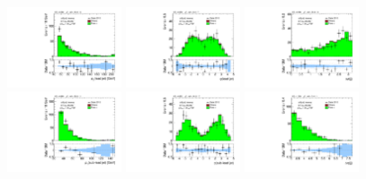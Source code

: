 \clearpage

\begin{figure}[tp]
  \centering
  \includegraphics[width=0.30\textwidth]{figures/analysis/vbf-ZllCR/jet-1-pt}
  \includegraphics[width=0.30\textwidth]{figures/analysis/vbf-ZllCR/jet-1-eta}
  \includegraphics[width=0.30\textwidth]{figures/analysis/vbf-ZllCR/jets-dphi} \\
  \includegraphics[width=0.30\textwidth]{figures/analysis/vbf-ZllCR/jet-2-pt}
  \includegraphics[width=0.30\textwidth]{figures/analysis/vbf-ZllCR/jet-2-eta}
  \includegraphics[width=0.30\textwidth]{figures/analysis/vbf-ZllCR/jets-deta} \\

\end{figure}

